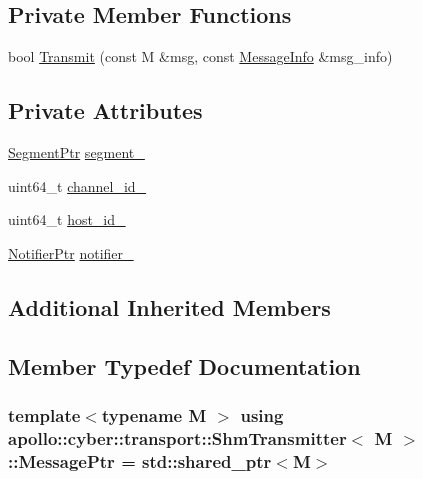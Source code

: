 \subsection*{Private Member Functions}
\begin{DoxyCompactItemize}
\item 
bool \hyperlink{classapollo_1_1cyber_1_1transport_1_1ShmTransmitter_a956db70c05903c96ac6a14ac1f92f636}{Transmit} (const M \&msg, const \hyperlink{classapollo_1_1cyber_1_1transport_1_1MessageInfo}{Message\-Info} \&msg\-\_\-info)
\end{DoxyCompactItemize}
\subsection*{Private Attributes}
\begin{DoxyCompactItemize}
\item 
\hyperlink{namespaceapollo_1_1cyber_1_1transport_ae92e21f5ec6b011ba398cd6907465406}{Segment\-Ptr} \hyperlink{classapollo_1_1cyber_1_1transport_1_1ShmTransmitter_a527f62b8c1680536bee1ca9b77606a09}{segment\-\_\-}
\item 
uint64\-\_\-t \hyperlink{classapollo_1_1cyber_1_1transport_1_1ShmTransmitter_acf81c9fa97f65a949ce4c8cfbb7ed7db}{channel\-\_\-id\-\_\-}
\item 
uint64\-\_\-t \hyperlink{classapollo_1_1cyber_1_1transport_1_1ShmTransmitter_ab392a50b184f87144a1f00207b51ff62}{host\-\_\-id\-\_\-}
\item 
\hyperlink{namespaceapollo_1_1cyber_1_1transport_ad7de1bbf34457c17c4d04b9bbfe152b4}{Notifier\-Ptr} \hyperlink{classapollo_1_1cyber_1_1transport_1_1ShmTransmitter_acb9ca393283d51f5464b291eb355aef7}{notifier\-\_\-}
\end{DoxyCompactItemize}
\subsection*{Additional Inherited Members}


\subsection{Member Typedef Documentation}
\hypertarget{classapollo_1_1cyber_1_1transport_1_1ShmTransmitter_a2970b67f207ebf3359f3b2b5e0407287}{
\subsubsection[{Message\-Ptr}]{\setlength{\rightskip}{0pt plus 5cm}template$<$typename M $>$ using {\bf apollo\-::cyber\-::transport\-::\-Shm\-Transmitter}$<$ M $>$\-::{\bf Message\-Ptr} =  std\-::shared\-\_\-ptr$<$M$>$}}\label{classapollo_1_1cyber_1_1transport_1_1ShmTransmitter_a2970b67f207ebf3359f3b2b5e0407287}



